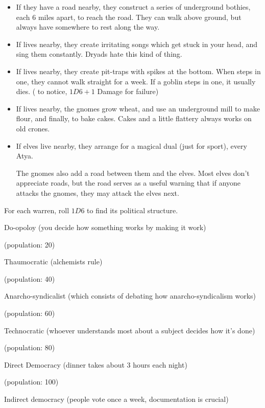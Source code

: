 \begin{multicols}{2}
\begin{itemize}
  \item
  If they have a road nearby, they construct a series of underground bothies, each 6 miles apart, to reach the road.
  They can walk above ground, but always have somewhere to rest along the way.
  \item
  If  lives nearby, they create irritating songs which get stuck in your head, and sing them constantly.  Dryads hate this kind of thing.
  \item
  If  lives nearby, they create pit-traps with spikes at the bottom.
  When  steps in one, they cannot walk straight for a week.
  If a goblin steps in one, it usually dies.
  ( \tn[12] to notice, $1D6+1$ Damage for failure)
  \item
  If  lives nearby, the gnomes grow wheat, and use an underground mill to make flour, and finally, to bake cakes.  Cakes and a little flattery always works on old crones.
  \item
  If elves live nearby, they arrange for a magical dual (just for sport), every \gls{Atya}.

  The gnomes also add a road between them and the elves.
  Most elves don't appreciate roads, but the road serves as a useful warning that if anyone attacks the gnomes, they may attack the elves next.
\end{itemize}

For each warren, roll $1D6$ to find its political structure.

\begin{dlist}
  \item
  Do-opoloy (you decide how something works by making it work)

  (population: 20)
  \item
  Thaumocratic (alchemists rule)

  (population: 40)
  \item
  Anarcho-syndicalist (which consists of debating how anarcho-syndicalism works)

  (population: 60)
  \item
  Technocratic (whoever understands most about a subject decides how it's done)

  (population: 80)
  \item
  Direct Democracy (dinner takes about 3 hours each night)

  (population: 100)
  \item
  Indirect democracy (people vote once a week, documentation is crucial)


\end{dlist}
\end{multicols}

